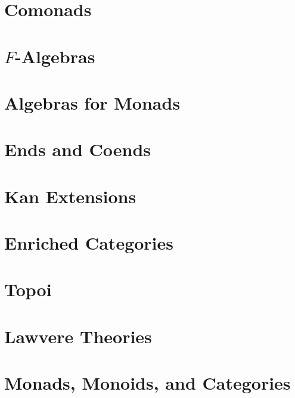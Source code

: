 \chapter{Comonads}\label{comonads}


\chapter{$F$-Algebras}\label{f-algebras}


\chapter{Algebras for Monads}\label{algebras-for-monads}


\chapter{Ends and Coends}\label{ends-and-coends}


\chapter{Kan Extensions}\label{kan-extensions}


\chapter{Enriched Categories}\label{enriched-categories}


\chapter{Topoi}\label{topoi}


\chapter{Lawvere Theories}\label{lawvere-theories}


\chapter{Monads, Monoids, and Categories}\label{monads-monoids-categories}


